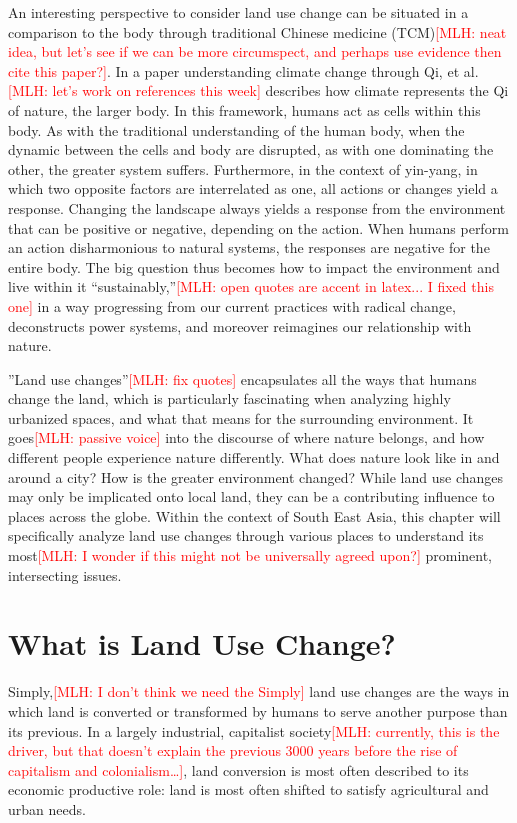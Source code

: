 \documentclass{book}\usepackage{knitr}
\newcommand{\red}[1]{\textcolor{red}{[MLH: #1]}}
\begin{document}
\begin{knitrout}
\begin{kframe}
An interesting perspective to consider land use change can be situated in a comparison to the body through traditional Chinese medicine (TCM)\red{neat idea, but let's see if we can be more circumspect, and perhaps use evidence then cite this paper?}. In a paper understanding climate change through Qi,  et al.\red{let's work on references this week} describes how climate represents the Qi of nature, the larger body. In this framework, humans act as cells within this body. As with the traditional understanding of the human body, when the dynamic between the cells and body are disrupted, as with one dominating the other, the greater system suffers. Furthermore, in the context of yin-yang, in which two opposite factors are interrelated as one, all actions or changes yield a response. Changing the landscape always yields a response from the environment that can be positive or negative, depending on the action. When humans perform an action disharmonious to natural systems, the responses are negative for the entire body. The big question thus becomes how to impact the environment and live within it ``sustainably,''\red{open quotes are accent in latex... I fixed this one} in a way progressing from our current practices with radical change, deconstructs power systems, and moreover reimagines our relationship with nature.

''Land use changes''\red{fix quotes} encapsulates all the ways that humans change the land, which is particularly fascinating when analyzing highly urbanized spaces, and what that means for the surrounding environment. It goes\red{passive voice} into the discourse of where nature belongs, and how different people experience nature differently. What does nature look like in and around a city? How is the greater environment changed? While land use changes may only be implicated onto local land, they can be a contributing influence to places across the globe. Within the context of South East Asia, this chapter will specifically analyze land use changes through various places to understand its most\red{I wonder if this might not be universally agreed upon?} prominent, intersecting issues.

\section{What is Land Use Change?}

Simply,\red{I don't think we need the Simply} land use changes are the ways in which land is converted or transformed by humans to serve another purpose than its previous. In a largely industrial, capitalist society\red{currently, this is the driver, but that doesn't explain the previous 3000 years before the rise of capitalism and colonialism\ldots }, land conversion is most often described to its economic productive role: land is most often shifted to satisfy agricultural and urban needs. 


\end{kframe}
\end{knitrout}
\end{document}
